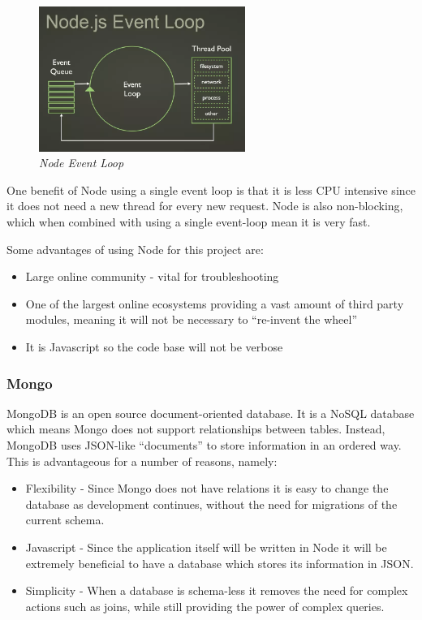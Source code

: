 \documentclass{article}
\begin{document}
\begin{figure}[!h]
\centering
\includegraphics*[width=0.6\textwidth]{images/event_loop}
\caption{\em Node Event Loop}
\label{fig:event_loop}
\end{figure}

One benefit of Node using a single event loop is that it is less CPU intensive since it does not need a new thread for every new request. Node is also non-blocking, which when combined with using a single event-loop mean it is very fast.

Some advantages of using Node for this project are:

\begin{itemize}
  \item Large online community - vital for troubleshooting
  \item One of the largest online ecosystems providing a vast amount of third party modules, meaning it will not be necessary to ``re-invent the wheel''
  \item It is Javascript so the code base will not be verbose
\end{itemize}

\subsubsection{Mongo}
MongoDB is an open source document-oriented database. It is a NoSQL database which means Mongo does not support relationships between tables. Instead, MongoDB uses JSON-like ``documents'' to store information in an ordered way. This is advantageous for a number of reasons, namely:

\begin{itemize}
  \item Flexibility - Since Mongo does not have relations it is easy to change the database as development continues, without the need for migrations of the current schema.
  \item Javascript - Since the application itself will be written in Node it will be extremely beneficial to have a database which stores its information in JSON.
  \item Simplicity - When a database is schema-less it removes the need for complex actions such as joins, while still providing the power of complex queries.
\end{itemize}
\end{document}

